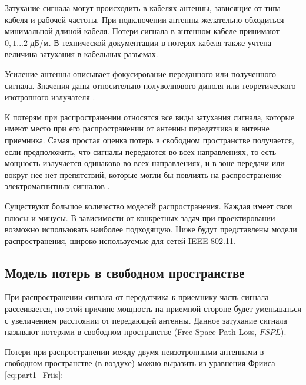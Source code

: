 Затухание сигнала могут происходить в кабелях антенны, зависящие от типа кабеля и рабочей частоты. При подключении антенны желательно обходиться минимальной длиной кабеля. Потери сигнала в антенном кабеле принимают $0, 1...2$ дБ/м. В технической документации в потерях кабеля также учтена величина затухания в кабельных разъемах. 

Усиление антенны описывает фокусирование переданного или полученного сигнала. Значения даны относительно полуволнового диполя или теоретического изотропного излучателя \cite{Gost62657}.


К потерям при распространении относятся все виды затухания сигнала, которые имеют место при его распространении от антенны передатчика к антенне приемника. Самая простая оценка потерь в свободном пространстве получается, если предположить, что сигналы передаются во всех направлениях, то есть мощность излучается одинаково во всех направлениях, и в зоне передачи или вокруг нее нет препятствий, которые могли бы повлиять на распространение электромагнитных сигналов \cite{Krouk2010}. 


Существуют большое количество моделей распространения. Каждая имеет свои плюсы и минусы. В зависимости от конкретных задач при проектировании возможно использовать наиболее подходящую. Ниже будут представлены модели распространения, широко используемые для сетей IEEE 802.11.  

\subsection{Модель потерь в свободном пространстве}
При распространении сигнала от передатчика к приемнику часть сигнала рассеивается, по этой причине мощность на приемной стороне будет уменьшаться с увеличением  расстоянии от передающей антенны. Данное затухание сигнала называют потерями в свободном пространстве (Free Space Path Loss, $FSPL$).

Потери при распространении между двумя неизотропными антеннами в свободном пространстве (в воздухе) можно выразить из уравнения Фрииса \cref{eq:part1_Friis}:


